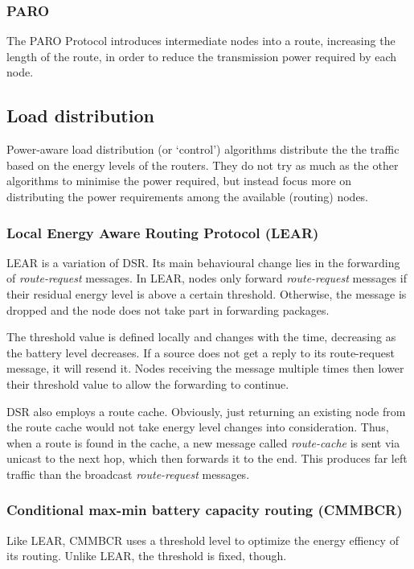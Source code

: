 \documentclass[conference]{IEEEtran}
\begin{document}
\subsubsection{PARO}
The PARO Protocol\cite{gomez2003paro} introduces intermediate nodes into a
route, increasing the length of the route, in order to reduce the transmission
power required by each node.

\subsection{Load distribution}
Power-aware load distribution (or `control') algorithms distribute the the
traffic based on the energy levels of the routers.
They do not try as much as the other algorithms to minimise the power required,
but instead focus more on distributing the power requirements among the available (routing) nodes.

\subsubsection{Local Energy Aware Routing Protocol (LEAR)}
LEAR\cite{woo2001non} is a variation of DSR.
Its main behavioural change lies in the forwarding of \textit{route-request} messages.
In LEAR, nodes only forward \textit{route-request} messages if their residual
energy level is above a certain threshold. Otherwise, the message is dropped
and the node does not take part in forwarding packages.

The threshold value is defined locally and changes with the time, decreasing
as the battery level decreases. If a source does not get a reply to its
route-request message, it will resend it. Nodes receiving the message multiple
times then lower their threshold value to allow the forwarding to continue.

DSR also employs a route cache. Obviously, just returning an existing node
from the route cache would not take energy level changes into consideration.
Thus, when a route is found in the cache, a new message called \textit{route-cache}
is sent via unicast to the next hop, which then forwards it to the end. This
produces far left traffic than the broadcast \textit{route-request} messages.

\subsubsection{Conditional max-min battery capacity routing (CMMBCR)}
Like LEAR, CMMBCR\cite{toh2001maximum} uses a threshold level to optimize
the energy effiency of its routing.
Unlike LEAR, the threshold is fixed, though.
\end{document}
